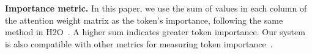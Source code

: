 \noindent \textbf{Importance metric.} 
In this paper, we use the sum of values
in each column of the attention weight matrix as the token's importance,
following the same method in H2O~\cite{h2o-nips23}. A higher sum indicates greater
token importance. Our system is also compatible with other metrics for measuring
token importance~\cite{scissorhands-nips23, flexgen-icml23, infinigen-osdi24}.




